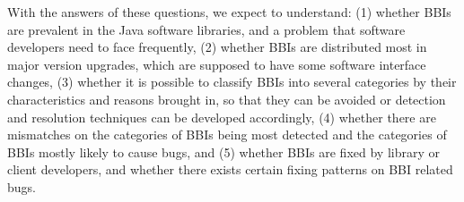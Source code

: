 With the answers of these questions, we expect to understand: (1) whether BBIs are prevalent in the Java software libraries, and a problem that software developers need to face frequently, (2) whether BBIs are distributed most in major version upgrades, which are supposed to have some software interface changes, (3) whether it is possible to classify BBIs into several categories by their characteristics and reasons brought in, so that they can be avoided or detection and resolution techniques can be developed accordingly, (4) whether there are mismatches on the categories of BBIs being most detected and the categories of BBIs mostly likely to cause bugs, and (5) whether BBIs are fixed by library or client developers, and whether there exists certain fixing patterns on BBI related bugs. 






